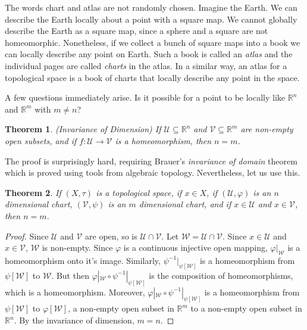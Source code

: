 \documentclass{article}
\theoremstyle{plain}
\newtheorem{theorem}{Theorem}[section]
\theoremstyle{normal}
\begin{document}
        The words chart and atlas are not randomly chosen. Imagine the Earth.
        We can describe the Earth locally about a point with a square map.
        We cannot globally describe the Earth as a square map, since a sphere
        and a square are not homeomorphic. Nonetheless, if we collect a bunch
        of square maps into a book we can locally describe any point on Earth.
        Such a book is called an \textit{atlas} and the individual pages are
        called \textit{charts} in the atlas. In a similar way, an atlas for a
        topological space is a book of charts that locally describe any point
        in the space.
        \par\hfill\par
        A few questions immediately arise. Is it possible for a point to be
        locally like $\mathbb{R}^{n}$ and $\mathbb{R}^{m}$ with $m\ne{n}$?
        \begin{theorem}{\textrm{(Invariance of Dimension)}}
            If $\mathcal{U}\subseteq\mathbb{R}^{n}$ and
            $\mathcal{V}\subseteq\mathbb{R}^{m}$ are non-empty open subsets,
            and if $f:\mathcal{U}\rightarrow\mathcal{V}$ is a homeomorphism,
            then $n=m$.
        \end{theorem}
        The proof is surprisingly hard, requiring Brauer's
        \textit{invariance of domain} theorem which is proved using tools from
        algebraic topology. Nevertheless, let us use this.
        \begin{theorem}
            If $(X,\tau)$ is a topological space, if $x\in{X}$, if
            $(\mathcal{U},\varphi)$ is an $n$ dimensional chart,
            $(\mathcal{V},\psi)$ is an $m$ dimensional chart, and if
            $x\in\mathcal{U}$ and $x\in\mathcal{V}$, then $n=m$.
        \end{theorem}
        \begin{proof}
            Since $\mathcal{U}$ and $\mathcal{V}$ are open, so is
            $\mathcal{U}\cap\mathcal{V}$. Let
            $\mathcal{W}=\mathcal{U}\cap\mathcal{V}$. Since $x\in\mathcal{U}$
            and $x\in\mathcal{V}$, $\mathcal{W}$ is non-empty. Since $\varphi$
            is a continuous injective open mapping, $\varphi|_{\mathcal{W}}$ is
            a homeomorphism onto it's image. Similarly,
            $\psi^{-1}|_{\psi[\mathcal{W}]}$ is a homeomorphism from
            $\psi[\mathcal{W}]$ to $\mathcal{W}$. But then
            $\varphi|_{\mathcal{W}}\circ\psi^{-1}|_{\psi[\mathcal{W}]}$ is the
            composition of homeomorphisms, which is a homeomorphism. Moreover,
            $\varphi|_{\mathcal{W}}\circ\psi^{-1}|_{\psi[\mathcal{W}]}$
            is a homeomorphism from $\psi[\mathcal{W}]$ to
            $\varphi[\mathcal{W}]$, a non-empty open subset in $\mathbb{R}^{m}$
            to a non-empty open subset in $\mathbb{R}^{n}$. By the invariance
            of dimension, $m=n$.
        \end{proof}
\end{document}
